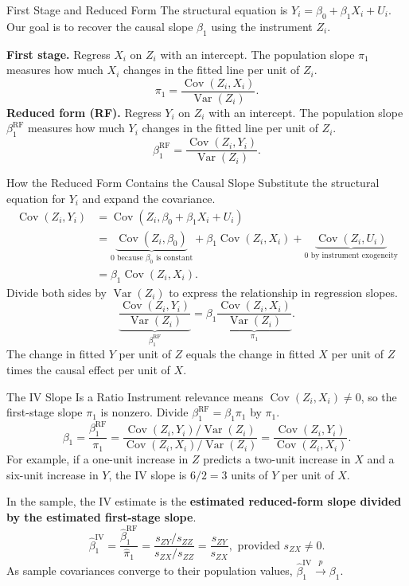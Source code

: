 \documentclass[notes,10pt, aspectratio=169]{beamer}
\begin{document}
\begin{frame}{First Stage and Reduced Form}
The structural equation is $Y_i=\beta_0+\beta_1X_i+U_i$. Our goal is to recover the causal slope $\beta_1$ using the instrument $Z_i$.

\medskip
\textbf{First stage.} Regress $X_i$ on $Z_i$ with an intercept. The population slope $\pi_1$ measures how much $X_i$ changes in the fitted line per unit of $Z_i$.
\[
\pi_1=\frac{\operatorname{Cov}(Z_i,X_i)}{\operatorname{Var}(Z_i)}.
\]
\textbf{Reduced form (RF).} Regress $Y_i$ on $Z_i$ with an intercept. The population slope $\beta_1^{\mathrm{RF}}$ measures how much $Y_i$ changes in the fitted line per unit of $Z_i$.
\[
\beta_1^{\mathrm{RF}}=\frac{\operatorname{Cov}(Z_i,Y_i)}{\operatorname{Var}(Z_i)}.
\]
\end{frame}

\begin{frame}{How the Reduced Form Contains the Causal Slope}
Substitute the structural equation for $Y_i$ and expand the covariance.
\[
\begin{aligned}
\operatorname{Cov}(Z_i,Y_i)
&=\operatorname{Cov}(Z_i,\beta_0+\beta_1 X_i+U_i)\\
&=\underbrace{\operatorname{Cov}(Z_i,\beta_0)}_{0\text{ because }\beta_0\text{ is constant}}
+\beta_1\operatorname{Cov}(Z_i,X_i)
+\underbrace{\operatorname{Cov}(Z_i,U_i)}_{0\text{ by instrument exogeneity}}\\
&=\beta_1\operatorname{Cov}(Z_i,X_i).
\end{aligned}
\]
Divide both sides by $\operatorname{Var}(Z_i)$ to express the relationship in regression slopes.
\[
\underbrace{\frac{\operatorname{Cov}(Z_i,Y_i)}{\operatorname{Var}(Z_i)}}_{\beta_1^{\mathrm{RF}}}
=\beta_1\underbrace{\frac{\operatorname{Cov}(Z_i,X_i)}{\operatorname{Var}(Z_i)}}_{\pi_1}.
\]
The change in fitted $Y$ per unit of $Z$ equals the change in fitted $X$ per unit of $Z$ times the causal effect per unit of $X$.
\end{frame}

\begin{frame}{The IV Slope Is a Ratio}
Instrument relevance means $\operatorname{Cov}(Z_i,X_i)\neq0$, so the first-stage slope $\pi_1$ is nonzero. Divide $\beta_1^{\mathrm{RF}}=\beta_1\pi_1$ by $\pi_1$.
\[
\beta_1=\frac{\beta_1^{\mathrm{RF}}}{\pi_1}
=\frac{\operatorname{Cov}(Z_i,Y_i)/\operatorname{Var}(Z_i)}
      {\operatorname{Cov}(Z_i,X_i)/\operatorname{Var}(Z_i)}
=\frac{\operatorname{Cov}(Z_i,Y_i)}{\operatorname{Cov}(Z_i,X_i)}.
\]
For example, if a one-unit increase in $Z$ predicts a two-unit increase in $X$ and a six-unit increase in $Y$, the IV slope is $6/2=3$ units of $Y$ per unit of $X$.

\medskip
In the sample, the IV estimate is the \textbf{estimated reduced-form slope divided by the estimated first-stage slope}.
\[
\hat\beta_1^{\mathrm{IV}}
=\frac{\hat\beta_1^{\mathrm{RF}}}{\hat\pi_1}
=\frac{s_{ZY}/s_{ZZ}}{s_{ZX}/s_{ZZ}}
=\frac{s_{ZY}}{s_{ZX}},\text{ provided }s_{ZX}\ne0.
\]
As sample covariances converge to their population values, $\hat\beta_1^{\mathrm{IV}}\xrightarrow{p}\beta_1$.
\end{frame}
\end{document}
